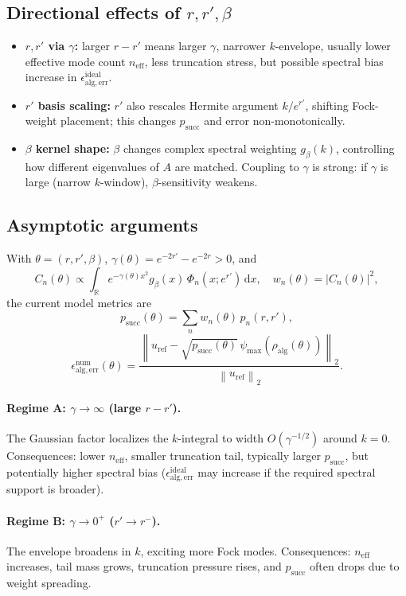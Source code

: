 \documentclass[11pt]{article}
\newcommand{\dd}{\mathrm{d}}
\newcommand{\RR}{\mathbb{R}}
\newcommand{\norm}[1]{\left\lVert #1 \right\rVert}
\begin{document}
\subsection{Directional effects of \texorpdfstring{$r,r',\beta$}{r,r',beta}}
\begin{itemize}[itemsep=3pt,topsep=3pt]
\item \textbf{\(r,r'\) via \(\gamma\):} larger \(r-r'\) means larger \(\gamma\), narrower \(k\)-envelope, usually lower effective mode count \(n_{\mathrm{eff}}\), less truncation stress, but possible spectral bias increase in \(\epsilon_{\mathrm{alg,err}}^{\mathrm{ideal}}\).
\item \textbf{\(r'\) basis scaling:} \(r'\) also rescales Hermite argument \(k/e^{r'}\), shifting Fock-weight placement; this changes \(p_{\mathrm{succ}}\) and error non-monotonically.
\item \textbf{\(\beta\) kernel shape:} \(\beta\) changes complex spectral weighting \(g_\beta(k)\), controlling how different eigenvalues of \(A\) are matched. Coupling to \(\gamma\) is strong: if \(\gamma\) is large (narrow \(k\)-window), \(\beta\)-sensitivity weakens.
\end{itemize}

\subsection{Asymptotic arguments}
With \(\theta=(r,r',\beta)\), \(\gamma(\theta)=e^{-2r'}-e^{-2r}>0\), and
\[
C_n(\theta)\propto\int_{\RR} e^{-\gamma(\theta)x^2} g_\beta(x)\,\Phi_n(x;e^{r'})\,\dd x,
\quad w_n(\theta)=|C_n(\theta)|^2,
\]
the current model metrics are
\[
p_{\mathrm{succ}}(\theta)=\sum_n w_n(\theta)\,p_n(r,r'),
\]
\[
\epsilon_{\mathrm{alg,err}}^{\mathrm{num}}(\theta)
=\frac{\norm{u_{\mathrm{ref}}-\sqrt{p_{\mathrm{succ}}(\theta)}\,
\psi_{\max}(\rho_{\mathrm{alg}}(\theta))}_2}{\norm{u_{\mathrm{ref}}}_2}.
\]

\paragraph{Regime A: \(\gamma\to\infty\) (large \(r-r'\)).}
The Gaussian factor localizes the \(k\)-integral to width \(O(\gamma^{-1/2})\) around \(k=0\).
Consequences: lower \(n_{\mathrm{eff}}\), smaller truncation tail, typically larger \(p_{\mathrm{succ}}\), but potentially higher spectral bias
(\(\epsilon_{\mathrm{alg,err}}^{\mathrm{ideal}}\) may increase if the required spectral support is broader).

\paragraph{Regime B: \(\gamma\to 0^+\) (\(r'\to r^{-}\)).}
The envelope broadens in \(k\), exciting more Fock modes.
Consequences: \(n_{\mathrm{eff}}\) increases, tail mass grows, truncation pressure rises, and \(p_{\mathrm{succ}}\) often drops due to weight spreading.
\end{document}
